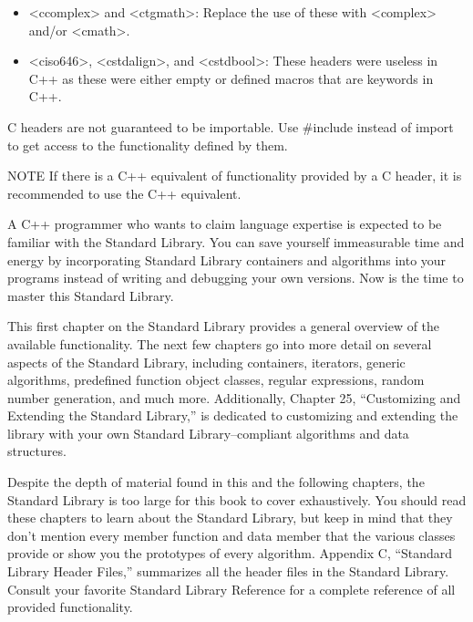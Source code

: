 \begin{itemize}
\item
<ccomplex> and <ctgmath>: Replace the use of these with <complex> and/or <cmath>.

\item
<ciso646>, <cstdalign>, and <cstdbool>: These headers were useless in C++ as these were either empty or defined macros that are keywords in C++.
\end{itemize}

C headers are not guaranteed to be importable. Use \#include instead of import to get access to the functionality defined by them.

\begin{myNotic}{NOTE}
If there is a C++ equivalent of functionality provided by a C header, it is recommended to use the C++ equivalent.
\end{myNotic}

A C++ programmer who wants to claim language expertise is expected to be familiar with the Standard Library. You can save yourself immeasurable time and energy by incorporating Standard Library containers and algorithms into your programs instead of writing and debugging your own versions. Now is the time to master this Standard Library.

This first chapter on the Standard Library provides a general overview of the available functionality. The next few chapters go into more detail on several aspects of the Standard Library, including containers, iterators, generic algorithms, predefined function object classes, regular expressions, random number generation, and much more. Additionally, Chapter 25, “Customizing and Extending the Standard Library,” is dedicated to customizing and extending the library with your own Standard Library–compliant algorithms and data structures.

Despite the depth of material found in this and the following chapters, the Standard Library is too large for this book to cover exhaustively. You should read these chapters to learn about the Standard Library, but keep in mind that they don’t mention every member function and data member that the various classes provide or show you the prototypes of every algorithm. Appendix C, “Standard Library Header Files,” summarizes all the header files in the Standard Library. Consult your favorite Standard Library Reference for a complete reference of all provided functionality.




















